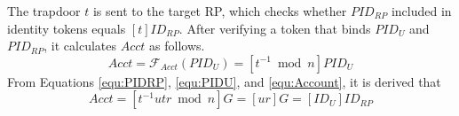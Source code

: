 The trapdoor $t$ is sent to the target RP, which checks whether $PID_{RP}$ included in identity tokens equals $[t]ID_{RP}$. After verifying a token that binds $PID_U$ and $PID_{RP}$, it calculates $Acct$ as follows.
\begin{equation}
Acct = \mathcal{F}_{Acct}(PID_{U})
   = [t^{-1} \bmod n]PID_{U}
   \label{equ:Account}
\end{equation}
From Equations \ref{equ:PIDRP}, \ref{equ:PIDU}, and \ref{equ:Account}, it is derived that
\begin{equation}
   Acct =  [t^{-1}utr \bmod n]G = [ur]G = [ID_U]ID_{RP}
   \label{equ:AccountNotChanged}
\end{equation}
%
